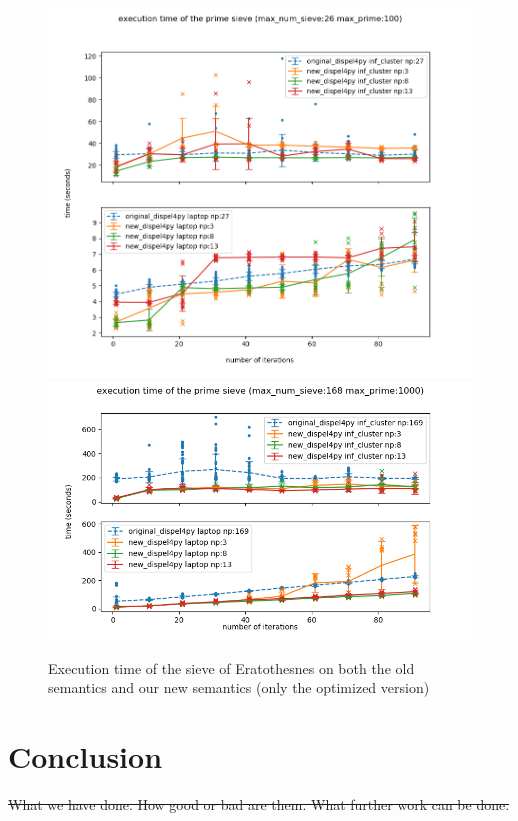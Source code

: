 \documentclass[•]{article}
\begin{document}
\begin{figure}[h]
	\centering
    \includegraphics[width=1\textwidth]{figures/sieve_opt1_100}
    \includegraphics[width=1\textwidth]{figures/sieve_opt1_1000}
	\caption{Execution time of the sieve of Eratothesnes on both the old semantics and our new semantics (only the optimized version)}
	\label{fig:sieve_opt1}
\end{figure}
	
	\section{Conclusion}
	\sout{What we have done. How good or bad are them. What further work can be done.}
	
	
	\pagebreak
	
	
\end{document}
